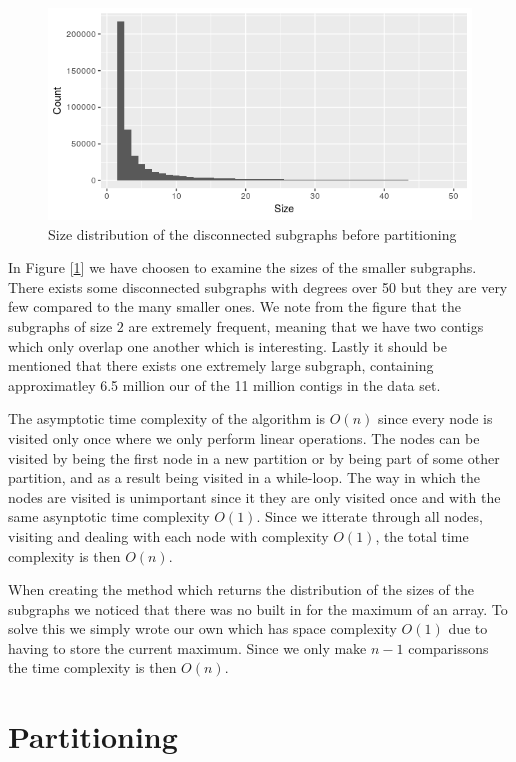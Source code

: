 \documentclass[a4paper,10pt]{article}
\newcommand\bref[1]{[\ref{#1}]}
\begin{document}
\begin{figure}[H]
	\centering
	\includegraphics[width=0.85\linewidth]{sizesprior.png}
	\caption{Size distribution of the disconnected subgraphs before partitioning}
	\label{fig:sizeprior}
\end{figure}

In Figure \bref{fig:sizeprior} we have choosen to examine the sizes of the smaller subgraphs. There exists some disconnected subgraphs with degrees over 50 but they are very few compared to the many smaller ones. We note from the figure that the subgraphs of size $2$ are extremely frequent, meaning that we have two contigs which only overlap one another which is interesting. Lastly it should be mentioned that there exists one extremely large subgraph, containing approximatley 6.5 million our of the 11 million contigs in the data set. 

\medskip

The asymptotic time complexity of the algorithm is $O(n)$ since every node is visited only once where we only perform linear operations. The nodes can be visited by being the first node in a new partition or by being part of
some other partition, and as a result being visited in a while-loop. The way in which the nodes are visited is unimportant since it they are only visited  once and with the same asynptotic time complexity $O(1)$. Since we itterate through all nodes, visiting and dealing with each node with complexity $O(1)$, the total time complexity is then $O(n)$.

\medskip

When creating the method which returns the distribution of the sizes of the subgraphs we noticed that there was no built in for the maximum of an array. To solve this we simply wrote our own which has space complexity $O(1)$ due to having to store the current maximum. Since we only make $n-1$ comparissons the time complexity is then $O(n)$.

\section{Partitioning}
\end{document}
